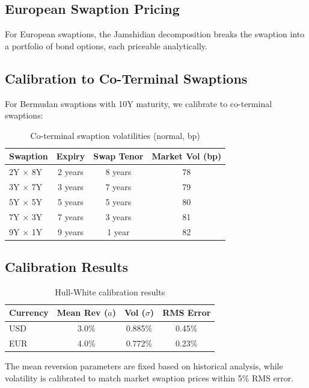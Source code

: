 \documentclass[10pt,a4paper]{article}
\begin{document}
\subsection{European Swaption Pricing}

For European swaptions, the Jamshidian decomposition breaks the swaption into a portfolio of bond options, each priceable analytically.

\subsection{Calibration to Co-Terminal Swaptions}

For Bermudan swaptions with 10Y maturity, we calibrate to co-terminal swaptions:

\begin{table}[H]
\centering
\begin{tabular}{lccc}
\toprule
\textbf{Swaption} & \textbf{Expiry} & \textbf{Swap Tenor} & \textbf{Market Vol (bp)} \\
\midrule
2Y $\times$ 8Y & 2 years & 8 years & 78 \\
3Y $\times$ 7Y & 3 years & 7 years & 79 \\
5Y $\times$ 5Y & 5 years & 5 years & 80 \\
7Y $\times$ 3Y & 7 years & 3 years & 81 \\
9Y $\times$ 1Y & 9 years & 1 year & 82 \\
\bottomrule
\end{tabular}
\caption{Co-terminal swaption volatilities (normal, bp)}
\end{table}

\subsection{Calibration Results}

\begin{table}[H]
\centering
\begin{tabular}{lccc}
\toprule
\textbf{Currency} & \textbf{Mean Rev ($a$)} & \textbf{Vol ($\sigma$)} & \textbf{RMS Error} \\
\midrule
USD & 3.0\% & 0.885\% & 0.45\% \\
EUR & 4.0\% & 0.772\% & 0.23\% \\
\bottomrule
\end{tabular}
\caption{Hull-White calibration results}
\end{table}

The mean reversion parameters are fixed based on historical analysis, while volatility is calibrated to match market swaption prices within 5\% RMS error.
\end{document}
